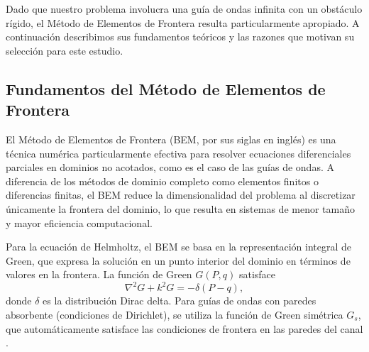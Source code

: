 \documentclass[11pt]{article}
\begin{document}
Dado que nuestro problema involucra una guía de ondas infinita con un obstáculo rígido, el Método de Elementos de Frontera resulta particularmente apropiado. A continuación describimos sus fundamentos teóricos y las razones que motivan su selección para este estudio.

\subsection{Fundamentos del Método de Elementos de Frontera}\label{subsec:fund_bem}

El Método de Elementos de Frontera \cite{Pozrikidis2002} (BEM, por sus siglas en inglés) es una técnica numérica particularmente efectiva para resolver ecuaciones diferenciales parciales en dominios no acotados, como es el caso de las guías de ondas. A diferencia de los métodos de dominio completo como elementos finitos o diferencias finitas, el BEM reduce la dimensionalidad del problema al discretizar únicamente la frontera del dominio, lo que resulta en sistemas de menor tamaño y mayor eficiencia computacional.

Para la ecuación de Helmholtz, el BEM se basa en la representación integral de Green, que expresa la solución en un punto interior del dominio en términos de valores en la frontera. La función de Green $G(P,q)$ satisface
\begin{equation}
\nabla^2 G + k^2 G = -\delta(P-q),
\label{eq:green_basic}
\end{equation}
donde $\delta$ es la distribución Dirac delta. Para guías de ondas con paredes absorbente (condiciones de Dirichlet), se utiliza la función de Green simétrica $G_s$, que automáticamente satisface las condiciones de frontera en las paredes del canal \cite{Linton1992}.
\end{document}
